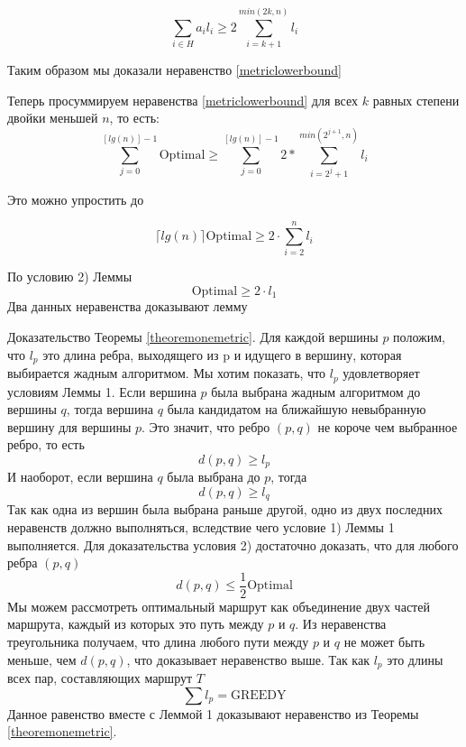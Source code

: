 \documentclass[a4paper, 14pt]{extarticle}
\numberwithin{equation}{section}
\begin{document}
\begin{equation}
	\sum_{i \in H} a_i l_i \geqslant 2 \sum_{i=k+1}^{min(2k, n)} l_i
	\label{sum}
\end{equation}

Таким образом мы доказали неравенство \eqref{metriclowerbound}

Теперь просуммируем неравенства \eqref{metriclowerbound} для всех $k$ равных степени двойки меньшей $n$, то есть:
\begin{equation*}
\sum_{j=0}^{[lg(n)]-1} \mathrm{Optimal} \geqslant \sum_{j=0}^{[lg(n)]-1} 2* \sum_{i=2^j+1}^{min(2^{j+1}, n)} l_i
\end{equation*}

Это можно упростить до

\begin{equation*}
\lceil lg(n) \rceil \mathrm{Optimal} \geqslant 2\cdot \sum_{i=2}^{n} l_i
\end{equation*}

По условию 2) Леммы
\begin{equation*}
\mathrm{Optimal} \geqslant 2 \cdot l_1
\end{equation*}
Два данных неравенства доказывают лемму

Доказательство Теоремы \eqref{theoremonemetric}. Для каждой  вершины $p$ положим, что $l_p$ это длина ребра, выходящего из p и идущего в вершину, которая выбирается жадным алгоритмом. Мы хотим показать, что $l_p$ удовлетворяет условиям Леммы 1. Если вершина $p$ была выбрана жадным алгоритмом до вершины $q$, тогда вершина $q$ была кандидатом на ближайшую невыбранную вершину для вершины $p$. Это значит, что ребро $(p,q)$ не короче чем выбранное ребро, то есть
\begin{equation*}
d(p,q) \geqslant l_p
\end{equation*}
И наоборот, если вершина $q$ была выбрана до $p$, тогда
\begin{equation*}
d(p,q) \geqslant l_q
\end{equation*}
Так как одна из вершин была выбрана раньше другой, одно из двух последних неравенств должно выполняться, вследствие чего  условие 1) Леммы 1 выполняется. Для доказательства условия 2) достаточно доказать, что для любого ребра $(p,q)$
\begin{equation*}
d(p,q) \leqslant \frac{1}{2} \mathrm{Optimal}
\end{equation*}
Мы можем рассмотреть оптимальный маршрут как объединение двух частей маршрута, каждый из которых это путь между $p$ и $q$. Из неравенства треугольника получаем, что длина любого пути между $p$ и $q$ не может быть меньше, чем $d(p,q)$, что доказывает неравенство выше. Так как $l_p$ это длины всех пар, составляющих маршрут $T$
\begin{equation*}
\sum l_p = \mathrm{GREEDY}
\end{equation*}
Данное равенство вместе с Леммой 1 доказывают неравенство из Теоремы \eqref{theoremonemetric}.\\
\end{document}
